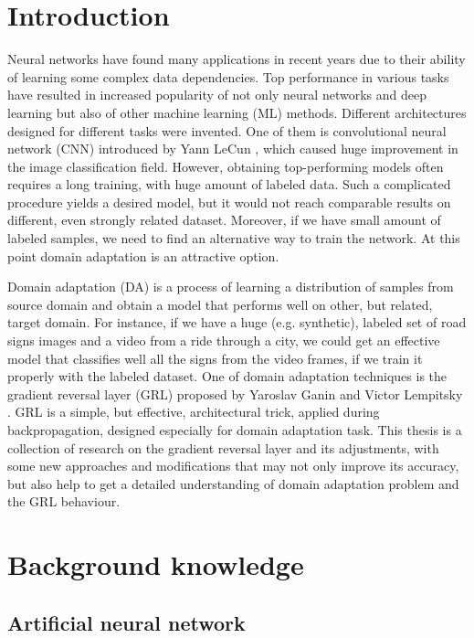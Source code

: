 \documentclass[shortabstract, inz, english]{iithesis}
\author{Wojciech Pratkowiecki}
\date{15 lutego 2019}
\begin{document}
\chapter{Introduction}
Neural networks have found many applications in recent years due to their ability of learning some complex data dependencies. Top performance in various tasks have resulted in increased popularity of not only neural networks and deep learning but also of other machine learning (ML) methods. Different architectures designed for different tasks were invented. One of them is convolutional neural network (CNN) introduced by Yann LeCun \cite{cnn}, which caused huge improvement in the image classification field. However, obtaining top-performing models often requires a long training, with huge amount of labeled data. Such a complicated procedure yields a desired model, but it would not reach comparable results on different, even strongly related dataset. Moreover, if we  have small amount of labeled samples, we need to find an alternative way to train the network. At this point domain adaptation is an attractive option.
\par
Domain adaptation (DA) is a process of learning a distribution of samples from source domain and obtain a model that performs well on other, but related, target domain. For instance, if we have a huge (e.g. synthetic), labeled set of road signs images and a video from a ride through a city, we could get an effective model that classifies well all the signs from the video frames, if we train it properly with the labeled dataset. One of domain adaptation techniques is the gradient reversal layer (GRL) proposed by Yaroslav Ganin and Victor Lempitsky \cite{pmlr-v37-ganin15}. GRL is a simple, but effective, architectural trick, applied during backpropagation, designed especially for domain adaptation task. This thesis is a collection of research on the gradient reversal layer and its adjustments, with some new approaches and modifications that may not only improve its accuracy, but also help to get a detailed understanding of domain adaptation problem and the GRL behaviour.

\chapter{Background knowledge}
\section{Artificial neural network}
\end{document}
